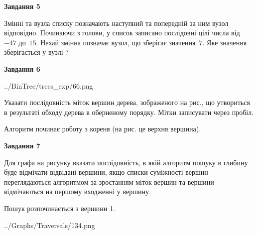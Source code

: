 \documentclass[12pt, ukrainian]{article}
\begin{document}
{\begin {large}
{\begin {center}\textbf{Завдання 5}\end {center}}\par
Змінні  та  вузла списку позначають наступний та попередній за ним вузол відповідно. Починаючи з голови, у список записано послідовні цілі числа від~$-47$ до~$15$. Нехай змінна  позначає вузол, що зберігає значення~$7$.
Яке значення зберігається у вузлі  ?\par
\newpage

{\begin {center}\textbf{Завдання 6}\end {center}}\par

\begin{center}
	{../BinTree/trees_exp/66.png}
\end{center}
Указати послідовність міток вершин дерева, зображеного на рис., що утвориться в результаті обходу дерева в оберненому порядку. Мітки записувати через пробіл.\par Алгоритм починає роботу з кореня (на рис. це верхня вершина).\par
\newpage

{\begin {center}\textbf{Завдання 7}\end {center}}\par
Для графа на рисунку вказати послідовність, в якій алгоритм пошуку в глибину буде відмічати відвідані вершини, якщо списки суміжності вершин переглядаються алгоритмом за зростанням міток вершин та вершини відмічаються на першому вход\-женні у вершину.\par
Пошук розпочинається з вершини 1.\par

\begin{center}
	{../Graphs/Traversals/134.png}
\end{center}\par
\newpage


\end{large}}
\end{document}
